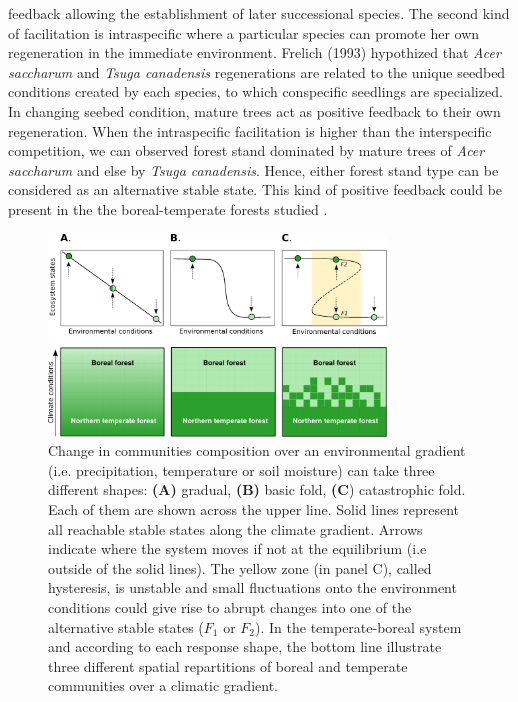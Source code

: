 feedback allowing the establishment of later successional species.  The second
kind of facilitation is intraspecific where a particular species can promote
her own regeneration in the immediate environment. Frelich (1993)
\cite{Society2014} hypothized that \textit{Acer saccharum} and \textit{Tsuga
canadensis} regenerations are related to the unique seedbed conditions created
by each species, to which conspecific seedlings are specialized. In changing
seebed condition, mature trees act as positive feedback to their own
regeneration. When the intraspecific facilitation is higher than the
interspecific competition, we can observed forest stand dominated by mature
trees of \textit{Acer saccharum} and else by \textit{Tsuga canadensis}. Hence,
either forest stand type can be considered as an alternative stable state.
This kind of positive feedback could be present in the the boreal-temperate
forests studied  \cite{Barras1998,Society2014}. \\


\begin{figure}[t]
	\begin{center}
	\includegraphics[width=0.8\textwidth]{fig/states.pdf}
	\end{center}
	\caption{Change in communities composition over an environmental gradient (i.e. precipitation, temperature or soil moisture) can take three different shapes: \textbf{(A)} gradual, \textbf{(B)} basic fold,
	\textbf{(C}) catastrophic fold. Each of them are shown across the upper
	line. Solid lines represent all reachable stable states along the climate gradient.  Arrows indicate
	where the system moves if not at the equilibrium (i.e outside of the solid lines). The yellow zone (in panel C),
	called hysteresis, is unstable and small fluctuations onto the environment
	conditions could give rise to abrupt changes into one of the alternative
	stable states ($F_1$ or $F_2$). In the temperate-boreal system and according to each response shape, the bottom line illustrate three different spatial repartitions of boreal and temperate communities over a climatic gradient.}
	\label{fig1}
	\vspace{-1em}
\end{figure}


